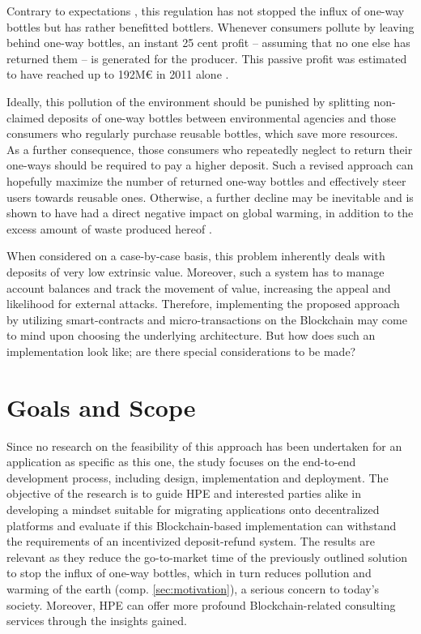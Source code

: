 Contrary to expectations  \cite[p.~10]{Hartlep2011Recycling}, this regulation has not stopped the influx of one-way bottles but has rather benefitted bottlers. Whenever consumers pollute by leaving behind one-way bottles, an instant 25 cent profit -- assuming that no one else has returned them -- is generated for the producer. This passive profit was estimated to have reached up to 192M\euro{} in 2011 alone \cite[p.~245]{PWC2011Mehrweg}. 

Ideally, this pollution of the environment should be punished by splitting non-claimed deposits of one-way bottles between environmental agencies and those consumers who regularly purchase reusable bottles, which save more resources. As a further consequence, those consumers who repeatedly neglect to return their one-ways should be required to pay a higher deposit. Such a revised approach can hopefully maximize the number of returned one-way bottles and effectively steer users towards reusable ones. Otherwise, a further decline may be inevitable and is shown to have had a direct negative impact on global warming, in addition to the excess amount of waste produced hereof \cite{DUHEinweg}.

When considered on a case-by-case basis, this problem inherently deals with deposits of very low extrinsic value. Moreover, such a system has to manage account balances and track the movement of value, increasing the appeal and likelihood for external attacks. Therefore, implementing the proposed approach by utilizing smart-contracts and micro-transactions on the Blockchain may come to mind upon choosing the underlying architecture. But how does such an implementation look like; are there special considerations to be made? 


\section{Goals and Scope}
Since no research on the feasibility of this approach has been undertaken for an application as specific as this one, the study focuses on the end-to-end development process, including design, implementation and deployment. The objective of the research is to guide \ac{HPE} and interested parties alike in developing a mindset suitable for migrating applications onto decentralized platforms and evaluate if this Blockchain-based implementation can withstand the requirements of an incentivized deposit-refund system. The results are relevant as they reduce the go-to-market time of the previously outlined solution to stop the influx of one-way bottles, which in turn reduces pollution and warming of the earth (comp. \ref{sec:motivation}), a serious concern to today's society. Moreover, \ac{HPE} can offer more profound Blockchain-related consulting services through the insights gained.

